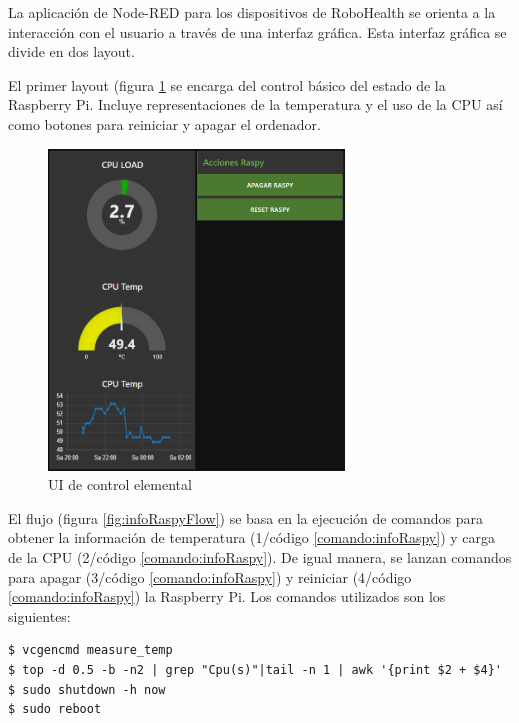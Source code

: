 La aplicación de Node-RED para los dispositivos de RoboHealth se orienta a la interacción con el usuario a través de una interfaz gráfica. Esta interfaz gráfica se divide en dos layout.

El primer layout (figura \ref{fig:infoRaspyDash} se encarga del control básico del estado de la Raspberry Pi. Incluye representaciones de la temperatura y el uso de la CPU así como botones para reiniciar y apagar el ordenador.

\begin{figure}[tb]
\centering
\includegraphics[width=0.7\textwidth]{figuras/infoRaspyDash.png}
\caption{UI de control elemental}
\label{fig:infoRaspyDash}
\end{figure}

El flujo (figura \ref{fig:infoRaspyFlow}) se basa en la ejecución de comandos para obtener la información de temperatura (1/código \ref{comando:infoRaspy}) y carga de la CPU (2/código \ref{comando:infoRaspy}). De igual manera, se lanzan comandos para apagar (3/código \ref{comando:infoRaspy}) y reiniciar (4/código \ref{comando:infoRaspy}) la Raspberry Pi. Los comandos utilizados son los siguientes:


\begin{lstlisting}[frame=single, label=command:ssh, label=comando:infoRaspy]
$ vcgencmd measure_temp
$ top -d 0.5 -b -n2 | grep "Cpu(s)"|tail -n 1 | awk '{print $2 + $4}'
$ sudo shutdown -h now
$ sudo reboot
\end{lstlisting}

